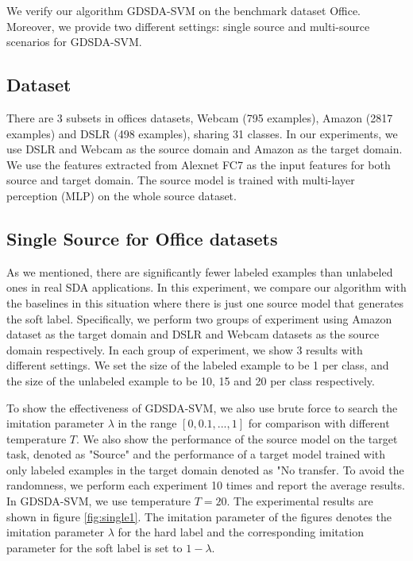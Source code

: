 We verify our algorithm GDSDA-SVM on the benchmark dataset Office. Moreover, we provide two different settings: single source and multi-source scenarios for GDSDA-SVM.
\subsection{Dataset}
There are 3 subsets in offices datasets, Webcam (795 examples), Amazon (2817 examples) and DSLR (498 examples), sharing 31 classes. In our experiments, we use DSLR and Webcam as the source domain and Amazon as the target domain.
We use the features extracted from Alexnet \cite{KrizhevskyNIPS12} FC7 as the input features for both source and target domain. The source model is trained with multi-layer perception (MLP) on the whole source dataset. 

\subsection{Single Source for Office datasets}
As we mentioned, there are significantly fewer labeled examples than unlabeled ones in real SDA applications. In this experiment, we compare our algorithm with the baselines in this situation where there is just one source model that generates the soft label. Specifically, we perform two groups of experiment using Amazon dataset as the target domain and DSLR and Webcam datasets as the source domain respectively. In each group of experiment, we show 3 results with different settings. We set the size of the labeled example to be 1 per class, and the size of the unlabeled example to be 10, 15 and 20 per class respectively.

To show the effectiveness of GDSDA-SVM, we also use brute force to search the imitation parameter $\lambda$ in the range $[0,0.1,...,1]$ for comparison with different temperature $T$. We also show the performance of the source model on the target task, denoted as "Source" and the performance of a target model trained with only labeled examples in the target domain denoted as "No transfer. To avoid the randomness, we perform each experiment 10 times and report the average results. In GDSDA-SVM, we use temperature $T=20$. The experimental results are shown in figure \ref{fig:single1}. The imitation parameter of the figures denotes the imitation parameter $\lambda$ for the hard label and the corresponding imitation parameter for the soft label is set to $1-\lambda$.

